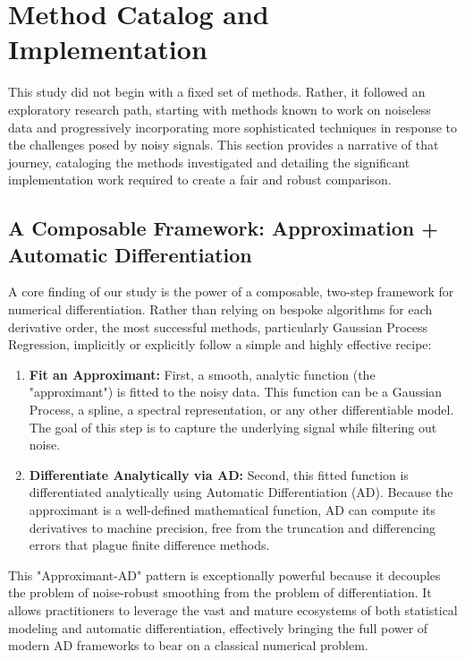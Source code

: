 \section{Method Catalog and Implementation}
\label{sec:methods}

This study did not begin with a fixed set of methods. Rather, it followed an exploratory research path, starting with methods known to work on noiseless data and progressively incorporating more sophisticated techniques in response to the challenges posed by noisy signals. This section provides a narrative of that journey, cataloging the methods investigated and detailing the significant implementation work required to create a fair and robust comparison.

\subsection{A Composable Framework: Approximation + Automatic Differentiation}
\label{sec:composable_framework}

A core finding of our study is the power of a composable, two-step framework for numerical differentiation. Rather than relying on bespoke algorithms for each derivative order, the most successful methods, particularly Gaussian Process Regression, implicitly or explicitly follow a simple and highly effective recipe:

\begin{enumerate}
    \item \textbf{Fit an Approximant:} First, a smooth, analytic function (the "approximant") is fitted to the noisy data. This function can be a Gaussian Process, a spline, a spectral representation, or any other differentiable model. The goal of this step is to capture the underlying signal while filtering out noise.
    \item \textbf{Differentiate Analytically via AD:} Second, this fitted function is differentiated analytically using Automatic Differentiation (AD). Because the approximant is a well-defined mathematical function, AD can compute its derivatives to machine precision, free from the truncation and differencing errors that plague finite difference methods.
\end{enumerate}

This "Approximant-AD" pattern is exceptionally powerful because it decouples the problem of noise-robust smoothing from the problem of differentiation. It allows practitioners to leverage the vast and mature ecosystems of both statistical modeling and automatic differentiation, effectively bringing the full power of modern AD frameworks to bear on a classical numerical problem.

